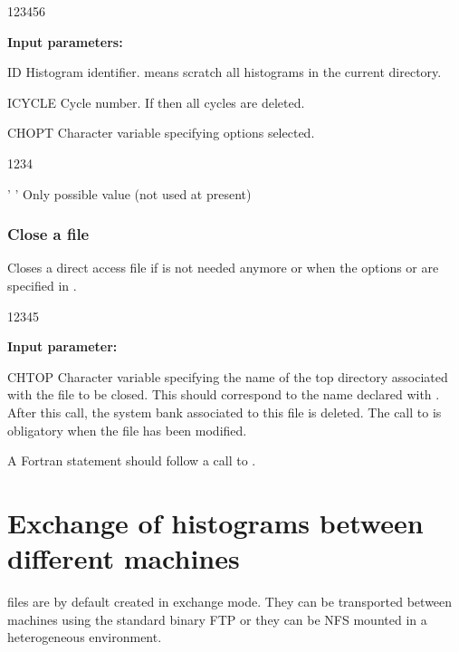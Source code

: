 \begin{DLtt}{123456}
\item[{\rm\bf Input parameters:}]
\item[ID]
Histogram identifier.
 means scratch all histograms in the current directory.
\item[ICYCLE]
Cycle number. If  then all cycles are deleted.
\item[CHOPT]
Character variable specifying options selected.
\begin{DLtt}{1234}
\item[' '] Only possible value (not used at present)
\end{DLtt}
\end{DLtt}
 
\subsubsection*{Close a file}
\label{HCLOSFIL} 

 
\Action
Closes a direct access file if is not needed anymore or
when the options  or  are specified in .
 
\begin{DLtt}{12345}
\item[{\rm\bf Input parameter:}]
\item[CHTOP]
Character variable specifying the name of the top directory
associated with the file to be closed. This should correspond to the
name declared with .
After this call, the system bank associated to this file is deleted.
The call to  is obligatory when the file
has been modified.
\end{DLtt}

\Remark

A Fortran  statement should follow a call to .
 
\newpage%

\section{Exchange of histograms between different machines}
\label{sec:histogram-transfer}

\HBOOK{} files are by default created in exchange mode. 
They can be transported between machines using the standard
binary FTP or they can be NFS mounted in a heterogeneous environment.

